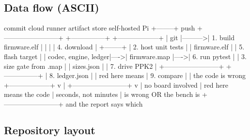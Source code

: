 \subsection*{Data flow (ASCII)}

\begin{asciiart}
  commit                cloud runner                    artifact store        self-hosted Pi
  +--------+   push   +------------------------+      +---------------+     +------------------+
  | git    |--------->| 1. build firmware.elf  |      |               |     | 4. download      |
  +--------+          | 2. host unit tests     |      | firmware.elf  |     | 5. flash target  |
                      |    codec, engine, ledger|---->| firmware.map  |---->| 6. run pytest    |
                      | 3. size gate from .map |      | sizes.json    |     | 7. drive PPK2    |
                      +------------------------+      +---------------+     | 8. ledger.json   |
                          |  red here means                                 | 9. compare       |
                          |  the code is wrong                              +------------------+
                          v                                                        |
                      +------------------------+                                   v
                      | no board involved      |                       red here means the code
                      | seconds, not minutes   |                       is wrong OR the bench is
                      +------------------------+                       and the report says which
\end{asciiart}

\subsection*{Repository layout}

